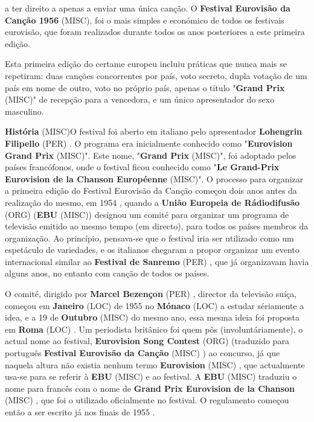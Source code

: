 \documentclass[12pt,a4paper]{article}
\begin{document}
a ter direito a apenas a enviar uma única canção. O \textbf{Festival Eurovisão da Canção 1956} (MISC), foi o mais simples e económico de todos os festivais eurovisão, que foram realizados durante todos os anos posteriores a este primeira edição.

Esta primeira edição do certame europeu incluiu práticas que nunca mais se repetiram: duas canções concorrentes por país, voto secreto, dupla votação de um país em nome de outro, voto no próprio país, apenas o título "\textbf{Grand Prix} (MISC)" de recepção para a vencedora, e um único apresentador do sexo masculino.



\textbf{História} (MISC)O festival foi aberto em italiano pelo apresentador \textbf{Lohengrin Filipello} (PER) . O programa era inicialmente conhecido como "\textbf{Eurovision Grand Prix} (MISC)". Este nome, "\textbf{Grand Prix} (MISC)", foi adoptado pelos países francófonos, onde o festival ficou conhecido como "\textbf{Le Grand-Prix Eurovision de la Chanson Européenne} (MISC)". O processo para organizar a primeira edição do Festival Eurovisão da Canção começou dois anos antes da realização do mesmo, em 1954 , quando a \textbf{União Europeia de Rádiodifusão} (ORG) (\textbf{EBU} (MISC)) designou um comité para organizar um programa de televisão emitido ao mesmo tempo (em directo), para todos os países membros da organização. Ao princípio, pensava-se que o festival iria ser utilizado como um espetáculo de variedades, e os italianos chegaram a propor organizar um evento internacional similar ao \textbf{Festival de Sanremo} (PER) , que já organizavam havia alguns anos, no entanto com canção de todos os países.

O comité, dirigido por \textbf{Marcel Bezençon} (PER) , director da televisão suíça, começou em \textbf{Janeiro} (LOC) de 1955 no \textbf{Mónaco} (LOC) a estudar sériamente a idea, e a 19 de \textbf{Outubro} (MISC) do mesmo ano, essa mesma ideia foi proposta em \textbf{Roma} (LOC) . Um periodista britânico foi quem pôs (involuntáriamente), o actual nome ao festival, \textbf{Eurovision Song Contest} (ORG) (traduzido para português \textbf{Festival Eurovisão da Canção} (MISC) ) ao concurso, já que naquela altura não existia nenhum termo \textbf{Eurovision} (MISC) , que actualmente usa-se para se referir à \textbf{EBU} (MISC) e ao festival. A \textbf{EBU} (MISC) traduziu o nome para francês com o nome de \textbf{Grand Prix Eurovision de la Chanson} (MISC) , que foi o utilizado oficialmente no festival. O regulamento começou então a ser escrito já nos finais de 1955 .
\end{document}
